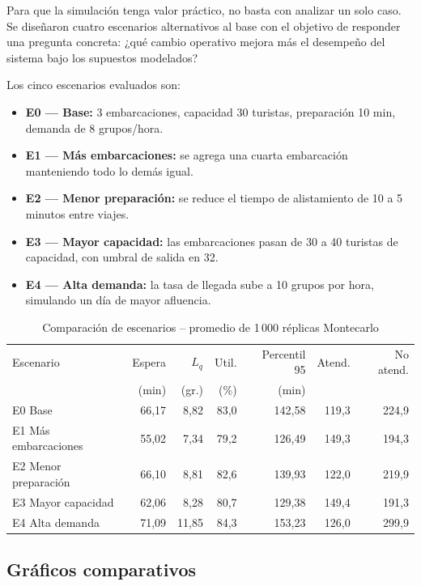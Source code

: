 \documentclass[12pt,a4paper]{article}
\begin{document}
Para que la simulación tenga valor práctico, no basta con analizar un
solo caso. Se diseñaron cuatro escenarios alternativos al base con el
objetivo de responder una pregunta concreta: ¿qué cambio operativo
mejora más el desempeño del sistema bajo los supuestos modelados?

Los cinco escenarios evaluados son:

\begin{itemize}[noitemsep]
  \item \textbf{E0 — Base:} 3 embarcaciones, capacidad 30 turistas,
    preparación 10 min, demanda de 8 grupos/hora.
  \item \textbf{E1 — Más embarcaciones:} se agrega una cuarta
    embarcación manteniendo todo lo demás igual.
  \item \textbf{E2 — Menor preparación:} se reduce el tiempo de
    alistamiento de 10 a 5 minutos entre viajes.
  \item \textbf{E3 — Mayor capacidad:} las embarcaciones pasan de 30
    a 40 turistas de capacidad, con umbral de salida en 32.
  \item \textbf{E4 — Alta demanda:} la tasa de llegada sube a 10
    grupos por hora, simulando un día de mayor afluencia.
\end{itemize}

\begin{table}[H]
  \centering
  \caption{Comparación de escenarios -- promedio de 1\,000 réplicas
    Montecarlo}
  \small
  \begin{tabular}{@{}lrrrrrr@{}}
    \toprule
    Escenario & Espera & $L_q$ & Util. & Percentil 95 & Atend. &
      No atend. \\
              & (min)  & (gr.) & (\%)  & (min)        &        & \\
    \midrule
    E0 Base              & 66,17 &  8,82 & 83,0 & 142,58 & 119,3 & 224,9 \\
    E1 Más embarcaciones & 55,02 &  7,34 & 79,2 & 126,49 & 149,3 & 194,3 \\
    E2 Menor preparación & 66,10 &  8,81 & 82,6 & 139,93 & 122,0 & 219,9 \\
    E3 Mayor capacidad   & 62,06 &  8,28 & 80,7 & 129,38 & 149,4 & 191,3 \\
    E4 Alta demanda      & 71,09 & 11,85 & 84,3 & 153,23 & 126,0 & 299,9 \\
    \bottomrule
  \end{tabular}
\end{table}

\subsection{Gráficos comparativos}
\end{document}
